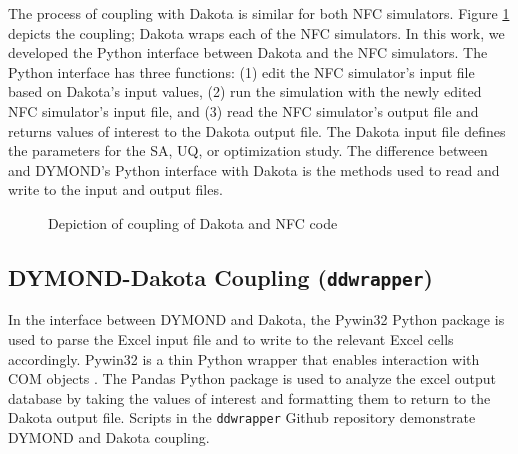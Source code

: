 The process of coupling with Dakota is similar 
for both \gls{NFC} simulators. 
Figure \ref{fig:dakota-NFC-flow} depicts the coupling; 
Dakota wraps each of the \gls{NFC} simulators.
In this work, we developed the Python interface between 
Dakota and the \gls{NFC} simulators.
The Python interface has three functions: 
(1) edit the \gls{NFC} simulator's input file based on Dakota's input values, 
(2) run the simulation with the newly edited \gls{NFC} simulator's input file, and 
(3) read the \gls{NFC} simulator's output file and returns values of interest 
to the Dakota output file. 
The Dakota input file defines the parameters for the \gls{SA}, \gls{UQ}, or 
optimization study.
The difference between \Cyclus and DYMOND's Python interface with Dakota is the
methods used to read and write to the input and output files. 

\begin{figure}[]
    \centering
    \caption{Depiction of coupling of Dakota and NFC code}
    \label{fig:dakota-NFC-flow}
\end{figure}

\subsection{DYMOND-Dakota Coupling (\texttt{ddwrapper})}
In the interface between DYMOND and Dakota, the Pywin32 
\cite{hammond_python_2000}
Python package is used to parse the Excel input file and to 
write to the relevant Excel cells accordingly. 
Pywin32 is a thin Python wrapper that enables interaction 
with COM objects \cite{hammond_python_2000}. 
The Pandas \cite{mckinney_pandas:_2011} Python
package is used to analyze the excel output database 
by taking the values of interest and formatting them 
to return to the Dakota output file.
Scripts in the \texttt{ddwrapper} Github repository \cite{chee_gwenchee/ddwrapper_2019}
demonstrate DYMOND and Dakota coupling. 

